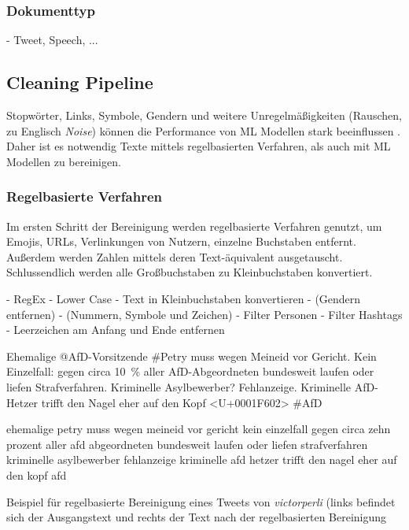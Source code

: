 \subsubsection{Dokumenttyp}

- Tweet, Speech, ...

\subsection{Cleaning Pipeline} \label{subsec:cleaningPipeline}

Stopwörter, Links, Symbole, Gendern und weitere Unregelmäßigkeiten (Rauschen, zu Englisch \textit{Noise}) können die Performance von \ac{ML} Modellen stark beeinflussen \autocite[4]{kowsari_text_2019}. Daher ist es notwendig Texte mittels regelbasierten Verfahren, als auch mit \ac{ML} Modellen zu bereinigen. 

\subsubsection{Regelbasierte Verfahren}


Im ersten Schritt der Bereinigung werden regelbasierte Verfahren genutzt, um Emojis, \acp{URL}, Verlinkungen von Nutzern, einzelne Buchstaben entfernt. Außerdem werden Zahlen mittels deren Text-äquivalent ausgetauscht. Schlussendlich werden alle Großbuchstaben zu Kleinbuchstaben konvertiert. 

- RegEx
    - Lower Case
    - Text in Kleinbuchstaben konvertieren
    - (Gendern entfernen)
    - (Nummern, Symbole und Zeichen)
    - Filter Personen
    - Filter Hashtags
    - Leerzeichen am Anfang und Ende entfernen


\begin{code}[H]
    \begin{minipage}{0.45\textwidth}
        \small
        Ehemalige @AfD-Vorsitzende \#Petry muss wegen Meineid vor Gericht. Kein Einzelfall: gegen circa \SI{10}{\percent} aller AfD-Abgeordneten bundesweit laufen oder liefen Strafverfahren. Kriminelle Asylbewerber? Fehlanzeige. Kriminelle AfD-Hetzer trifft den Nagel eher auf den Kopf <U+0001F602> \#AfD
    \end{minipage}\hfill
    \begin{minipage}{0.45\textwidth}
        \small
        ehemalige petry muss wegen meineid vor gericht kein einzelfall gegen circa zehn prozent aller afd abgeordneten bundesweit laufen oder liefen strafverfahren kriminelle asylbewerber fehlanzeige kriminelle afd hetzer trifft den nagel eher auf den kopf afd
    \end{minipage}\hfill
    \caption[Beispiel -- Regelbasierte Bereinigung]{Beispiel für regelbasierte Bereinigung eines Tweets von \textit{victorperli} (links befindet sich der Ausgangstext und rechts der Text nach der regelbasierten Bereinigung} \label{list:rulebasedCleaning}
\end{code}

